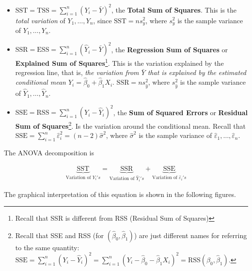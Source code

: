 \documentclass[]{book}
\providecommand{\tightlist}{%
  \setlength{\itemsep}{0pt}\setlength{\parskip}{0pt}}
\let\rmarkdownfootnote\footnote%
\def\footnote{\protect\rmarkdownfootnote}
\theoremstyle{definition}
\theoremstyle{definition}
\theoremstyle{definition}
\theoremstyle{remark}
\begin{document}
\begin{itemize}
\tightlist
\item
  \(\text{SST}=\text{TSS}=\sum_{i=1}^n\left(Y_i-\bar Y\right)^2\), the
  \textbf{Total Sum of Squares}. This is the \emph{total variation} of
  \(Y_1,\ldots,Y_n\), since \(\text{SST}=ns_y^2\), where \(s_y^2\) is
  the sample variance of \(Y_1,\ldots,Y_n\).
\item
  \(\text{SSR}=\text{ESS}=\sum_{i=1}^n\left(\hat Y_i-\bar Y\right)^2\),
  the \textbf{Regression Sum of Squares} or \textbf{Explained Sum of
  Squares}\footnote{Recall that SSR is different from RSS (Residual Sum
    of Squares)}. This is the variation explained by the regression
  line, that is, \emph{the variation from \(\bar Y\) that is explained
  by the estimated conditional mean
  \(\hat Y_i=\hat\beta_0+\hat\beta_1X_i\)}.
  \(\text{SSR}=ns_{\hat y}^2\), where \(s_{\hat y}^2\) is the sample
  variance of \(\hat Y_1,\ldots,\hat Y_n\).
\item
  \(\text{SSE}=\text{RSS}=\sum_{i=1}^n\left(Y_i-\hat Y_i\right)^2\), the
  \textbf{Sum of Squared Errors} or \textbf{Residual Sum of
  Squares}\footnote{Recall that SSE and RSS (for
    \((\hat \beta_0,\hat \beta_1)\)) are just different names for
    referring to the same quantity:
    \(\text{SSE}=\sum_{i=1}^n\left(Y_i-\hat Y_i\right)^2=\sum_{i=1}^n\left(Y_i-\hat \beta_0-\hat \beta_1X_i\right)^2=\mathrm{RSS}\left(\hat \beta_0,\hat \beta_1\right)\).}.
  Is the variation around the conditional mean. Recall that
  \(\text{SSE}=\sum_{i=1}^n \hat\varepsilon_i^2=(n-2)\hat\sigma^2\),
  where \(\hat\sigma^2\) is the sample variance of
  \(\hat \varepsilon_1,\ldots,\hat \varepsilon_n\).
\end{itemize}

The ANOVA decomposition is

\begin{align*}
\underbrace{\text{SST}}_{\text{Variation of }Y_i's} = \underbrace{\text{SSR}}_{\text{Variation of }\hat Y_i's} + \underbrace{\text{SSE}}_{\text{Variation of }\hat \varepsilon_i's}
\end{align*}

The graphical interpretation of this equation is shown in the following
figures.
\end{document}
